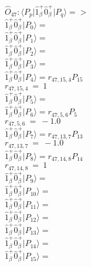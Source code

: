 \documentclass[14pt]{article}
\begin{document}
    $\hat{O}_{47}:  \langle{P_p}\vert \hat{1}_{\beta}^{+}\hat{0}_{\beta}^{+} \vert{P_q}\rangle => $ \\ 
    $ \hat{1}_{\beta}^{+}\hat{0}_{\beta}^{+} \vert{P_{0}}\rangle =  $ \\ 
    $ \hat{1}_{\beta}^{+}\hat{0}_{\beta}^{+} \vert{P_{1}}\rangle =  $ \\ 
    $ \hat{1}_{\beta}^{+}\hat{0}_{\beta}^{+} \vert{P_{2}}\rangle =  $ \\ 
    $ \hat{1}_{\beta}^{+}\hat{0}_{\beta}^{+} \vert{P_{3}}\rangle =  $ \\ 
    $ \hat{1}_{\beta}^{+}\hat{0}_{\beta}^{+} \vert{P_{4}}\rangle = {r}_{47,15,4}P_{15} $ \\ 
    ${r}_{47,15,4}\ =\ 1 $ \\ 
    $ \hat{1}_{\beta}^{+}\hat{0}_{\beta}^{+} \vert{P_{5}}\rangle =  $ \\ 
    $ \hat{1}_{\beta}^{+}\hat{0}_{\beta}^{+} \vert{P_{6}}\rangle = {r}_{47,5,6}P_{5} $ \\ 
    ${r}_{47,5,6}\ =\ -1.0 $ \\ 
    $ \hat{1}_{\beta}^{+}\hat{0}_{\beta}^{+} \vert{P_{7}}\rangle = {r}_{47,13,7}P_{13} $ \\ 
    ${r}_{47,13,7}\ =\ -1.0 $ \\ 
    $ \hat{1}_{\beta}^{+}\hat{0}_{\beta}^{+} \vert{P_{8}}\rangle = {r}_{47,14,8}P_{14} $ \\ 
    ${r}_{47,14,8}\ =\ 1 $ \\ 
    $ \hat{1}_{\beta}^{+}\hat{0}_{\beta}^{+} \vert{P_{9}}\rangle =  $ \\ 
    $ \hat{1}_{\beta}^{+}\hat{0}_{\beta}^{+} \vert{P_{10}}\rangle =  $ \\ 
    $ \hat{1}_{\beta}^{+}\hat{0}_{\beta}^{+} \vert{P_{11}}\rangle =  $ \\ 
    $ \hat{1}_{\beta}^{+}\hat{0}_{\beta}^{+} \vert{P_{12}}\rangle =  $ \\ 
    $ \hat{1}_{\beta}^{+}\hat{0}_{\beta}^{+} \vert{P_{13}}\rangle =  $ \\ 
    $ \hat{1}_{\beta}^{+}\hat{0}_{\beta}^{+} \vert{P_{14}}\rangle =  $ \\ 
    $ \hat{1}_{\beta}^{+}\hat{0}_{\beta}^{+} \vert{P_{15}}\rangle =  $ \\ 
    
\end{document}
